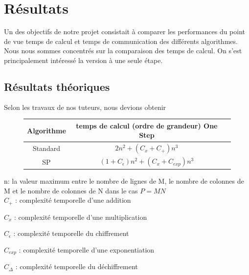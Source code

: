
\section{Résultats}

Un des objectifs de notre projet consistait à comparer les performances du point de vue temps de calcul et temps de communication des différents algorithmes. Nous nous sommes concentrés sur la comparaison des temps de calcul.
On s'est principalement intéressé la version à une seule étape.

\subsection{Résultats théoriques}

Selon les travaux de nos tuteurs, nous devions obtenir

\begin{figure}[H]
  \begin{center}
    \begin{tabular}{|c|c|c|} \hline
      Algorithme & temps de calcul (ordre de grandeur) One Step  \\
      \hline
      Standard & $2n^{2} + (C_{x} + C_{+})n^{3}$ \\
	  \hline
	  SP & $ (1+C_{\epsilon})n^2 + (C_{x} + C_{exp})n^{3} $ \\
	  \hline  
    \end{tabular}
  \end{center} 
\end{figure}

\noindent n: la valeur maximum entre le nombre de lignes de M, le nombre de colonnes de M et le nombre de colonnes de N dans le cas $P=MN$ \\
$C_{+}$ : complexité temporelle d'une addition \par
\noindent $C_{x}$ : complexité temporelle d'une multiplication \par
\noindent $C_{\epsilon}$ : complexité temporelle du chiffrement \par
\noindent $C_{exp}$ : complexité temporelle d'une exponentiation \par
\noindent $C_{\Delta}$ : complexité temporelle  du déchiffrement

